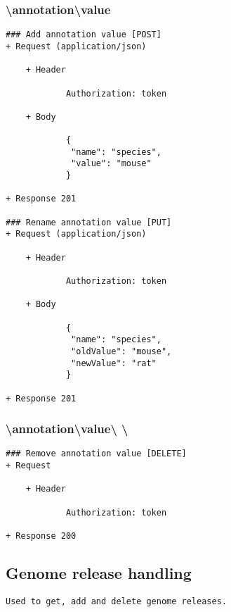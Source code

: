 \subsubsection*{\textbackslash annotation\textbackslash value}
\begin{verbatim}
### Add annotation value [POST]
+ Request (application/json)

    + Header
    
            Authorization: token
            
    + Body
    
            {
             "name": "species",
             "value": "mouse"
            }

+ Response 201

### Rename annotation value [PUT]
+ Request (application/json)

    + Header
    
            Authorization: token
            
    + Body
    
            {
             "name": "species",
             "oldValue": "mouse",
             "newValue": "rat"
            }

+ Response 201
\end{verbatim}
\subsubsection*{\textbackslash annotation\textbackslash value\textbackslash <field-name> \textbackslash <value-name>}
\begin{verbatim}
### Remove annotation value [DELETE]
+ Request

    + Header 
        
            Authorization: token

+ Response 200
\end{verbatim}

\subsection*{Genome release handling}
\begin{verbatim}
Used to get, add and delete genome releases.
\end{verbatim}
